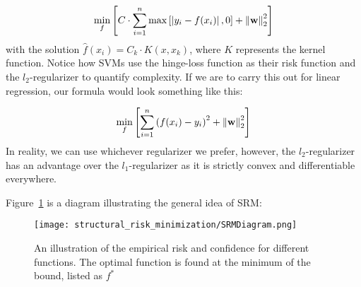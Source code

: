 \begin{equation}\label{srm2}
\centering
\underset{f}{\mathrm{min}}\left[C\cdot\sum_{i=1}^{n}{\mathrm{max}}\left[\left|y_{i}-f(x_{i})\right|,0\right]+\left\Vert \mathbf{w}\right\Vert_{2}^{2}\right]
\end{equation}
\newline
with the solution $\hat{f}(x_{i})=C_{k}\cdot K(x,x_{k})$, where $K$ represents the kernel function. Notice how SVMs use the hinge-loss function as their risk function and the $l_{2}$-regularizer to quantify complexity. 
\newline
If we are to carry this out for linear regression, our formula would
look something like this:

\begin{equation}\label{srm3}
\centering
\underset{f}{\mathrm{min}}\left[\sum_{i=1}^{n}\left(f(x_{i})-y_{i}\right)^{2}+\left\Vert \mathbf{w}\right\Vert _{2}^{2}\right]
\end{equation}
\newline
In reality, we can use whichever regularizer we prefer, however, the $l_{2}$-regularizer has an advantage over the $l_{1}$-regularizer as it is strictly convex and differentiable everywhere.

Figure~\ref{fig:srm} is a diagram illustrating the general idea of SRM:

\begin{figure}[h!]
\centering
\texttt{[image: structural\_risk\_minimization/SRMDiagram.png]}
\caption{An illustration of the empirical risk and confidence for different functions. The optimal function is found at the minimum of the bound, listed as $f^{*}$}
\label{fig:srm}
\end{figure}

